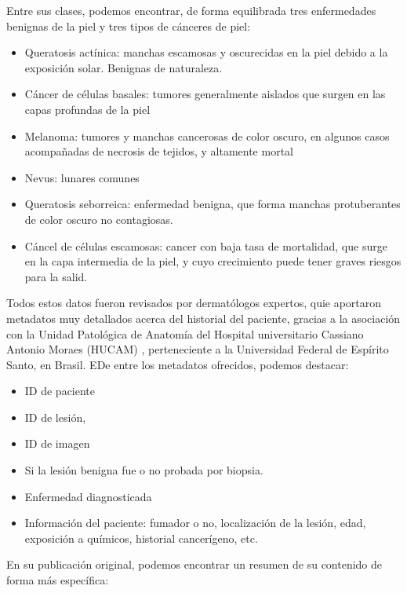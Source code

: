 Entre sus clases, podemos encontrar, de forma equilibrada tres enfermedades benignas de la piel y tres tipos de cánceres de piel:

\begin{itemize}
	\item Queratosis actínica: manchas escamosas y oscurecidas en la piel debido a la exposición solar. Benignas de naturaleza.
	\item Cáncer de células basales: tumores generalmente aislados que surgen en las capas profundas de la piel
	\item Melanoma: tumores y manchas cancerosas de color oscuro, en algunos casos acompañadas de necrosis de tejidos, y altamente mortal
	\item Nevus: lunares comunes
	\item Queratosis seborreica: enfermedad benigna, que forma manchas protuberantes de color oscuro no contagiosas.
	\item Cáncel de células escamosas: cancer con baja tasa de mortalidad, que surge en la capa intermedia de la piel, y cuyo crecimiento puede tener graves riesgos para la salid.
	\end{itemize}

 Todos estos datos fueron revisados por dermatólogos expertos, quie aportaron metadatos muy detallados acerca del historial del paciente, gracias a la asociación con la Unidad Patológica de Anatomía del Hospital universitario Cassiano Antonio Moraes (HUCAM) , perteneciente a la Universidad Federal de Espírito Santo, en Brasil. EDe entre los metadatos ofrecidos, podemos destacar:

\begin{itemize}
	\item ID de paciente
	\item ID de lesión,
	\item ID de imagen
	\item Si la lesión benigna fue o no probada por biopsia.
	\item Enfermedad diagnosticada
	\item Información del paciente: fumador o no, localización de la lesión, edad, exposición a químicos, historial cancerígeno, etc.
\end{itemize}

En su publicación original\cite{PACHECO2020106221}, podemos encontrar un resumen de su contenido de forma más específica:


